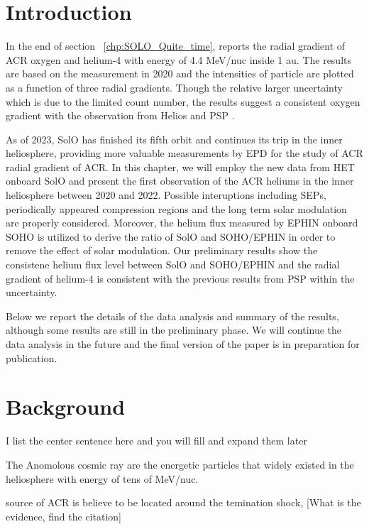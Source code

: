 
\section{Introduction}

In the end of section ~\ref{chp:SOLO_Quite_time}, \citet{Mason-2021-SolOQuietTime} reports the radial gradient of \ac{ACR} oxygen and helium-4 with energy of 4.4 MeV/nuc inside 1 au. The results are based on the measurement in 2020 and the intensities of particle are plotted as a function of three radial gradients. Though the relative larger uncertainty which is due to the limited count number, the results suggest a consistent oxygen gradient with the observation from Helios and \ac{PSP} \citep{Rankin2021ApJ,Marquardt2018AA}.

As of 2023, \ac{SolO} has finished its fifth orbit and continues its trip in the inner heliosphere, providing more valuable measurements by \ac{EPD} for the study of \ac{ACR} radial gradient of \ac{ACR}. 
In this chapter, we will employ the new data from \ac{HET} onboard \ac{SolO} and present the first observation of the \ac{ACR} heliums in the inner heliosphere between 2020 and 2022. Possible interuptions including \acp{SEP}, periodically appeared compression regions and the long term solar modulation are properly considered. Moreover, the helium flux measured by \ac{EPHIN} onboard \ac{SOHO} is utilized to derive the ratio of \ac{SolO} and \ac{SOHO}/\ac{EPHIN} in order to remove the effect of solar modulation. Our preliminary results show the consistene helium flux level between \ac{SolO} and \ac{SOHO}/\ac{EPHIN} and the radial gradient of helium-4 is consistent with the previous results from \ac{PSP} within the uncertainty.

Below we report the details of the data analysis and summary of the results, although some results are still in the preliminary phase. We will continue the data analysis in the future and the final version of the paper is in preparation for publication.



\section{Background}
I list the center sentence here and you will fill and expand them later

The Anomolous cosmic ray are the energetic particles that widely existed in the heliosphere with energy of tens of MeV/nuc.


source of ACR is believe to be located around the temination shock,  [What is the evidence, find the citation]

